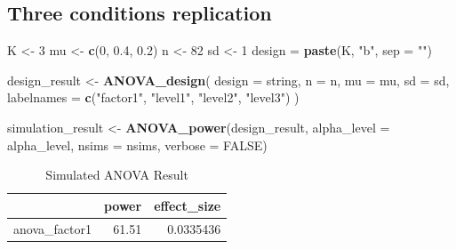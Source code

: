 \documentclass[]{book}
\newenvironment{Shaded}{\begin{snugshade}}{\end{snugshade}}
\newcommand{\DataTypeTok}[1]{\textcolor[rgb]{0.13,0.29,0.53}{#1}}
\newcommand{\DecValTok}[1]{\textcolor[rgb]{0.00,0.00,0.81}{#1}}
\newcommand{\FloatTok}[1]{\textcolor[rgb]{0.00,0.00,0.81}{#1}}
\newcommand{\KeywordTok}[1]{\textcolor[rgb]{0.13,0.29,0.53}{\textbf{#1}}}
\newcommand{\NormalTok}[1]{#1}
\newcommand{\OtherTok}[1]{\textcolor[rgb]{0.56,0.35,0.01}{#1}}
\newcommand{\StringTok}[1]{\textcolor[rgb]{0.31,0.60,0.02}{#1}}
\begin{document}
\hypertarget{three-conditions-replication-2}{%
\subsection{Three conditions replication}\label{three-conditions-replication-2}}

\begin{Shaded}
\begin{Highlighting}[]
\NormalTok{K <-}\StringTok{ }\DecValTok{3}
\NormalTok{mu <-}\StringTok{ }\KeywordTok{c}\NormalTok{(}\DecValTok{0}\NormalTok{, }\FloatTok{0.4}\NormalTok{, }\FloatTok{0.2}\NormalTok{)}
\NormalTok{n <-}\StringTok{ }\DecValTok{82}
\NormalTok{sd <-}\StringTok{ }\DecValTok{1}
\NormalTok{design =}\StringTok{ }\KeywordTok{paste}\NormalTok{(K, }\StringTok{"b"}\NormalTok{, }\DataTypeTok{sep =} \StringTok{""}\NormalTok{)}
\end{Highlighting}
\end{Shaded}

\begin{Shaded}
\begin{Highlighting}[]
\NormalTok{design_result <-}\StringTok{ }\KeywordTok{ANOVA_design}\NormalTok{(}
  \DataTypeTok{design =}\NormalTok{ string,}
  \DataTypeTok{n =}\NormalTok{ n,}
  \DataTypeTok{mu =}\NormalTok{ mu,}
  \DataTypeTok{sd =}\NormalTok{ sd,}
  \DataTypeTok{labelnames =} \KeywordTok{c}\NormalTok{(}\StringTok{"factor1"}\NormalTok{, }\StringTok{"level1"}\NormalTok{, }\StringTok{"level2"}\NormalTok{, }\StringTok{"level3"}\NormalTok{)}
\NormalTok{  )}
\end{Highlighting}
\end{Shaded}

\begin{Shaded}
\begin{Highlighting}[]
\NormalTok{simulation_result <-}\StringTok{ }\KeywordTok{ANOVA_power}\NormalTok{(design_result, }
                                 \DataTypeTok{alpha_level =}\NormalTok{ alpha_level, }
                                 \DataTypeTok{nsims =}\NormalTok{ nsims,}
                                 \DataTypeTok{verbose =} \OtherTok{FALSE}\NormalTok{)}
\end{Highlighting}
\end{Shaded}

\begin{table}[!h]

\caption{\label{tab:unnamed-chunk-75}Simulated ANOVA Result}
\centering
\begin{tabular}{l|r|r}
\hline
  & power & effect\_size\\
\hline
anova\_factor1 & 61.51 & 0.0335436\\
\hline
\end{tabular}
\end{table}
\end{document}
